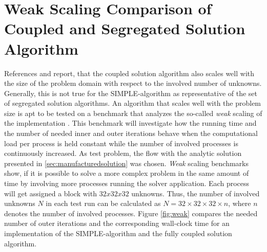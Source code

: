 \section{Weak Scaling Comparison of Coupled and Segregated Solution Algorithm}
\label{sec:weakscaling}

References \cite{darwish09} and \cite{vakilipour12} report, that the coupled solution algorithm also scales well with the size of the problem domain with respect to the involved number of unknowns. Generally, this is not true for the SIMPLE-algorithm as representative of the set of segregated solution algorithms. An algorithm that scales well with the problem size is apt to be tested on a benchmark that analyzes the so-called \emph{weak} scaling of the implementation \cite{hager11}. This benchmark will investigate how the running time and the number of needed inner and outer iterations behave when the computational load per process is held constant while the number of involved processes is continuously increased. As test problem, the flow with the analytic solution presented in \ref{sec:manufacturedsolution} was chosen. \emph{Weak} scaling benchmarks show, if it is possible to solve a more complex problem in the same amount of time by involving more processes running the solver application. Each process will get assigned a block with \(32x32x32\) unknowns. Thus, the number of involved unknowns \(N\) in each test run can be calculated as \( N = 32\times32\times32\times n \), where \(n\) denotes the number of involved processes. Figure \ref{fig:weak} compares the needed number of outer iterations and the corresponding wall-clock time for an implementation of the SIMPLE-algorithm and the fully coupled solution algorithm.


